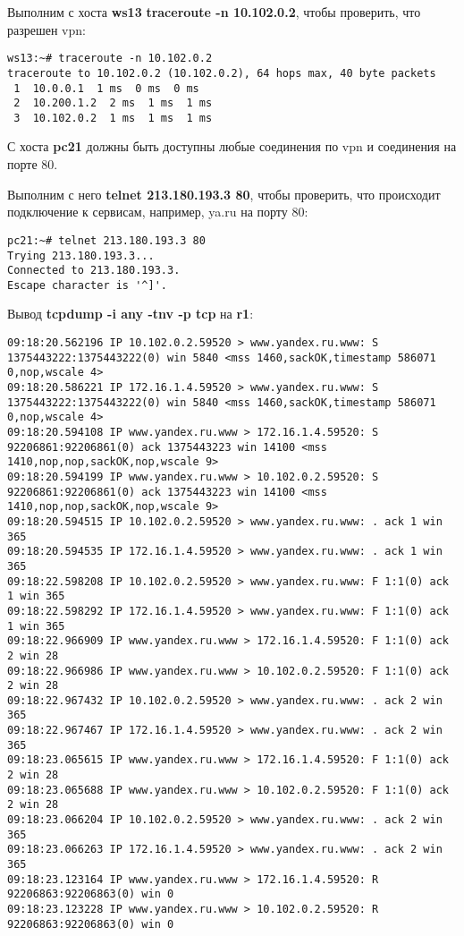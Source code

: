 \documentclass[a4paper,12pt]{article}
\begin{document}
Выполним с хоста \textbf{ws13} \textbf{traceroute -n 10.102.0.2},  чтобы проверить,
что разрешен vpn:
\begin{Verbatim}
ws13:~# traceroute -n 10.102.0.2
traceroute to 10.102.0.2 (10.102.0.2), 64 hops max, 40 byte packets
 1  10.0.0.1  1 ms  0 ms  0 ms
 2  10.200.1.2  2 ms  1 ms  1 ms
 3  10.102.0.2  1 ms  1 ms  1 ms
\end{Verbatim}

С хоста \textbf{pc21} должны быть доступны любые соединения по vpn и
соединения на порте 80.

Выполним с него \textbf{telnet 213.180.193.3 80},  чтобы проверить, что
происходит подключение к сервисам, например, ya.ru на порту 80:
\begin{Verbatim}
pc21:~# telnet 213.180.193.3 80
Trying 213.180.193.3...
Connected to 213.180.193.3.
Escape character is '^]'.
\end{Verbatim}

Вывод \textbf{tcpdump -i any -tnv -p tcp} на \textbf{r1}:
\begin{Verbatim}
09:18:20.562196 IP 10.102.0.2.59520 > www.yandex.ru.www: S 1375443222:1375443222(0) win 5840 <mss 1460,sackOK,timestamp 586071 0,nop,wscale 4>
09:18:20.586221 IP 172.16.1.4.59520 > www.yandex.ru.www: S 1375443222:1375443222(0) win 5840 <mss 1460,sackOK,timestamp 586071 0,nop,wscale 4>
09:18:20.594108 IP www.yandex.ru.www > 172.16.1.4.59520: S 92206861:92206861(0) ack 1375443223 win 14100 <mss 1410,nop,nop,sackOK,nop,wscale 9>
09:18:20.594199 IP www.yandex.ru.www > 10.102.0.2.59520: S 92206861:92206861(0) ack 1375443223 win 14100 <mss 1410,nop,nop,sackOK,nop,wscale 9>
09:18:20.594515 IP 10.102.0.2.59520 > www.yandex.ru.www: . ack 1 win 365
09:18:20.594535 IP 172.16.1.4.59520 > www.yandex.ru.www: . ack 1 win 365
09:18:22.598208 IP 10.102.0.2.59520 > www.yandex.ru.www: F 1:1(0) ack 1 win 365
09:18:22.598292 IP 172.16.1.4.59520 > www.yandex.ru.www: F 1:1(0) ack 1 win 365
09:18:22.966909 IP www.yandex.ru.www > 172.16.1.4.59520: F 1:1(0) ack 2 win 28
09:18:22.966986 IP www.yandex.ru.www > 10.102.0.2.59520: F 1:1(0) ack 2 win 28
09:18:22.967432 IP 10.102.0.2.59520 > www.yandex.ru.www: . ack 2 win 365
09:18:22.967467 IP 172.16.1.4.59520 > www.yandex.ru.www: . ack 2 win 365
09:18:23.065615 IP www.yandex.ru.www > 172.16.1.4.59520: F 1:1(0) ack 2 win 28
09:18:23.065688 IP www.yandex.ru.www > 10.102.0.2.59520: F 1:1(0) ack 2 win 28
09:18:23.066204 IP 10.102.0.2.59520 > www.yandex.ru.www: . ack 2 win 365
09:18:23.066263 IP 172.16.1.4.59520 > www.yandex.ru.www: . ack 2 win 365
09:18:23.123164 IP www.yandex.ru.www > 172.16.1.4.59520: R 92206863:92206863(0) win 0
09:18:23.123228 IP www.yandex.ru.www > 10.102.0.2.59520: R 92206863:92206863(0) win 0
\end{Verbatim}
\end{document}
